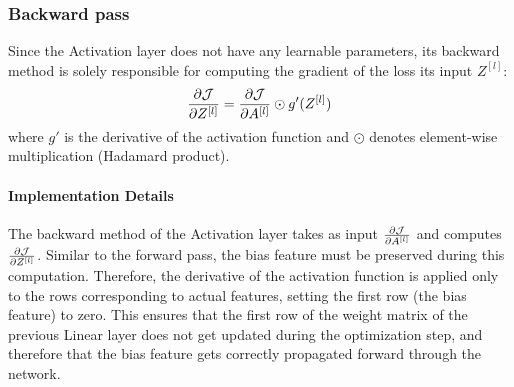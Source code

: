 \subsubsection{Backward pass}
Since the Activation layer does not have any learnable parameters, its backward method is solely responsible for computing the gradient of the loss \wrt its input $Z^{[l]}$:
\begin{equation*}
    \pdv{\mathcal{J}}{Z^{[l]}} = \pdv{\mathcal{J}}{A^{[l]}} \odot g'(Z^{[l]})
\end{equation*}
where $g'$ is the derivative of the activation function and $\odot$ denotes element-wise multiplication (Hadamard product).

\paragraph{Implementation Details} The backward method of the Activation layer takes as input $\pdv{\mathcal{J}}{A^{[l]}}$ and computes $\pdv{\mathcal{J}}{Z^{[l]}}$. Similar to the forward pass, the bias feature must be preserved during this computation. Therefore, the derivative of the activation function is applied only to the rows corresponding to actual features, setting the first row (the bias feature) to zero. This ensures that the first row of the weight matrix of the previous Linear layer does not get updated during the optimization step, and therefore that the bias feature gets correctly propagated forward through the network.
